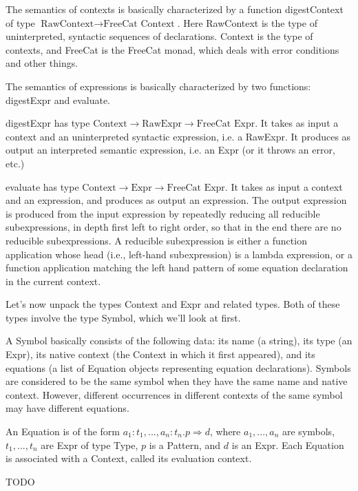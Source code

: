 \documentclass{article}
\begin{document}
The semantics of contexts is basically characterized by a function digestContext of type $\text{RawContext} \to \text{FreeCat Context}$. Here RawContext is the type of uninterpreted, syntactic sequences of declarations. Context is the type of contexts, and FreeCat is the FreeCat monad, which deals with error conditions and other things.

The semantics of expressions is basically characterized by two functions: digestExpr and evaluate.

digestExpr has type $\text{Context} \to \text{RawExpr} \to \text{FreeCat Expr}$. It takes as input a context and an uninterpreted syntactic expression, i.e. a RawExpr. It produces as output an interpreted semantic expression, i.e. an Expr (or it throws an error, etc.)

evaluate has type $\text{Context} \to \text{Expr} \to \text{FreeCat Expr}$. It takes as input a context and an expression, and produces as output an expression. The output expression is produced from the input expression by repeatedly reducing all reducible subexpressions, in depth first left to right order, so that in the end there are no reducible subexpressions. A reducible subexpression is either a function application whose head (i.e., left-hand subexpression) is a lambda expression, or a function application matching the left hand pattern of some equation declaration in the current context.

Let's now unpack the types Context and Expr and related types. Both of these types involve the type Symbol, which we'll look at first.

A Symbol basically consists of the following data: its name (a string), its type (an Expr), its native context (the Context in which it first appeared), and its equations (a list of Equation objects representing equation declarations). Symbols are considered to be the same symbol when they have the same name and native context. However, different occurrences in different contexts of the same symbol may have different equations.

An Equation is of the form $a_1 : t_1, ..., a_n : t_n. p \Rightarrow d$, where $a_1,...,a_n$ are symbols, $t_1,...,t_n$ are Expr of type Type, $p$ is a Pattern, and $d$ is an Expr. Each Equation is associated with a Context, called its evaluation context.

TODO
\end{document}
